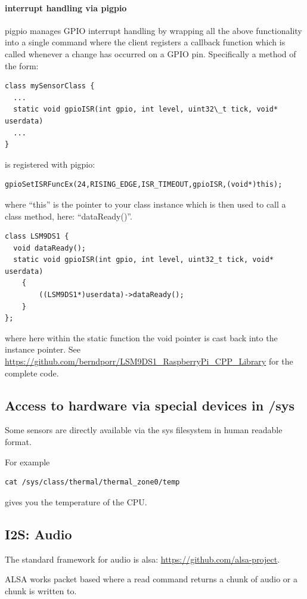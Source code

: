 \documentclass[12pt]{report}
\begin{document}
\paragraph{interrupt handling via pigpio}
pigpio manages GPIO interrupt handling by wrapping all the above
functionality into a single command where the client registers a
callback function which is called whenever a change has occurred on a
GPIO pin.
Specifically a method of the form:
\begin{verbatim}
class mySensorClass {
  ...
  static void gpioISR(int gpio, int level, uint32\_t tick, void* userdata)
  ...
}
\end{verbatim}
is registered with pigpio:
\begin{verbatim}
gpioSetISRFuncEx(24,RISING_EDGE,ISR_TIMEOUT,gpioISR,(void*)this);
\end{verbatim}
where ``this'' is the pointer to your class instance which is then used
to call a class method, here: ``dataReady()''.
\begin{verbatim}
class LSM9DS1 {
  void dataReady();
  static void gpioISR(int gpio, int level, uint32_t tick, void* userdata)
    {
        ((LSM9DS1*)userdata)->dataReady();
    }
};
\end{verbatim}
where here within the static function the void pointer is cast back into the instance pointer.
See \url{https://github.com/berndporr/LSM9DS1_RaspberryPi_CPP_Library} for the complete code.



\subsection{Access to hardware via special devices in /sys}
Some sensors are directly available via the sys filesystem in human readable format.

For example
\begin{verbatim}
cat /sys/class/thermal/thermal_zone0/temp
\end{verbatim}
gives you the temperature of the CPU.




\subsection{I2S: Audio}
The standard framework for audio is alsa: \url{https://github.com/alsa-project}.

ALSA works packet based where a read command
returns a chunk of audio or a chunk is written to.
\end{document}
